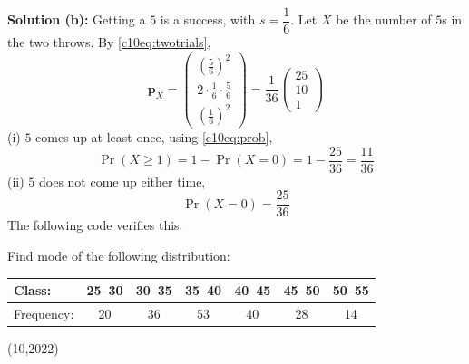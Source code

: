 \textbf{Solution (b):} Getting a $5$ is a success, with $s = \dfrac{1}{6}$. Let $X$ be the number of $5$s in the two throws. By \eqref{c10eq:twotrials},
\begin{equation}
\mathbf{p}_X = \begin{pmatrix} \left(\frac{5}{6}\right)^2 \\ 2\cdot\frac{1}{6}\cdot\frac{5}{6} \\ \left(\frac{1}{6}\right)^2 \end{pmatrix} = \frac{1}{36}\begin{pmatrix} 25 \\ 10 \\ 1 \end{pmatrix}
\end{equation}
(i) $5$ comes up at least once, using \eqref{c10eq:prob},
\begin{equation}
\Pr(X \ge 1) = 1 - \Pr(X = 0) = 1 - \frac{25}{36} = \frac{11}{36}
\end{equation}
(ii) $5$ does not come up either time,
\begin{equation}
\Pr(X = 0) = \frac{25}{36}
\end{equation}
The following code verifies this.

\nopagebreak[4]
\begin{center}
\end{center}

\item Find mode of the following distribution:
\begin{center}
\begin{tabular}{|l|c|c|c|c|c|c|}
\hline
Class: & 25--30 & 30--35 & 35--40 & 40--45 & 45--50 & 50--55 \\ \hline
Frequency: & 20 & 36 & 53 & 40 & 28 & 14 \\ \hline
\end{tabular}
\end{center}
\hfill (10,2022)

